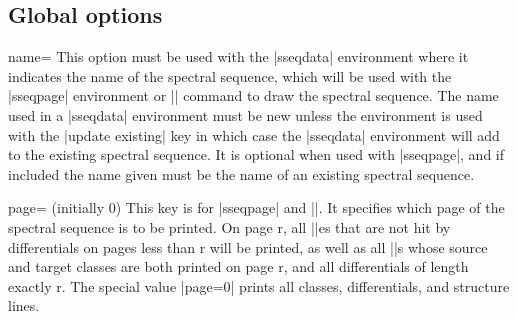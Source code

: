 \documentclass{ltxdoc}
\begin{document}
\begin{sseqdata}[name=ex1,degree={#1}{1-#1}]
\section{Global options}
\begin{key}{name=}
This option must be used with the |sseqdata| environment where it indicates the name of the spectral sequence, which will be used with the |sseqpage| environment or |\printpage| command to draw the spectral sequence. The name used in a |sseqdata| environment must be new unless the environment is used with the |update existing| key in which case the |sseqdata| environment will add to the existing spectral sequence. It is optional when used with |sseqpage|, and if included the name given must be the name of an existing spectral sequence.
\end{key}

\begin{key}{page= (initially 0)}
This key is for |sseqpage| and |\printpage|. It specifies which page of the spectral sequence is to be printed. On page r, all |\class|es that are not hit by differentials on pages less than r will be printed, as well as all |\structline|s whose source and target classes are both printed on page r, and all differentials of length exactly r. The special value |page=0| prints all classes, differentials, and structure lines.
\end{key}

\end{sseqdata}
\end{document}
